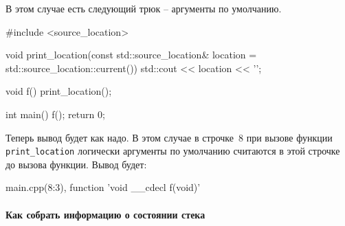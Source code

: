 В этом случае есть следующий трюк -- аргументы по умолчанию.
\begin{cppcode}
#include <source_location>

void print_location(const  std::source_location& location = std::source_location::current()) {
  std::cout << location << '\n';
}

void f() {
  print_location();
}

int main() {
  f();
  return 0;
}
\end{cppcode}
Теперь вывод будет как надо.
В этом случае в строчке~$8$ при вызове функции \verb"print_location" логически аргументы по умолчанию считаются в этой строчке до вызова функции.
Вывод будет:
\begin{cppcode}
main.cpp(8:3), function 'void __cdecl f(void)'
\end{cppcode}

\paragraph{Как собрать информацию о состоянии стека}

